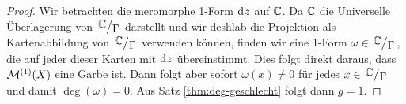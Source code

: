 \begin{proof}
  Wir betrachten die meromorphe 1-Form $\d[z]$ auf $\mathbb{C}$. Da $\mathbb{C}$ die
  Universelle Überlagerung von $\quot{\C}{\Gamma}$ darstellt und wir
  deshlab die Projektion als Kartenabbildung von $\quot{\C}{\Gamma}$
  verwenden können, finden wir eine 1-Form $\omega \in
  \quot{\C}{\Gamma}$, die auf jeder dieser Karten mit $\d[z]$
  übereinstimmt. Dies folgt direkt daraus, dass $\mathcal{M}^{(1)}(X)$ eine
  Garbe ist. Dann folgt aber sofort $\omega(x) \neq 0$ für jedes $x
  \in \quot{\C}{\Gamma}$ und damit $\deg(\omega) = 0$. Aus Satz
  \ref{thm:deg-geschlecht} folgt dann $g = 1$.
\end{proof}



